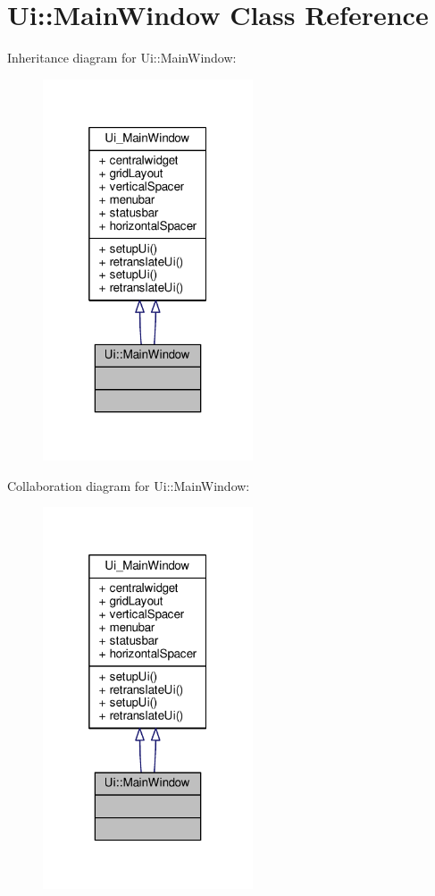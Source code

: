 \hypertarget{class_ui_1_1_main_window}{\section{Ui\-:\-:Main\-Window Class Reference}
\label{class_ui_1_1_main_window}
}


Inheritance diagram for Ui\-:\-:Main\-Window\-:\nopagebreak
\begin{figure}[H]
\begin{center}
\leavevmode
\includegraphics[width=176pt]{class_ui_1_1_main_window__inherit__graph}
\end{center}
\end{figure}


Collaboration diagram for Ui\-:\-:Main\-Window\-:\nopagebreak
\begin{figure}[H]
\begin{center}
\leavevmode
\includegraphics[width=176pt]{class_ui_1_1_main_window__coll__graph}
\end{center}
\end{figure}
